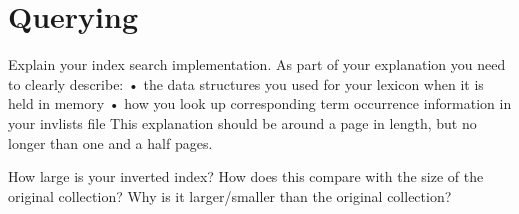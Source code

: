
\section{Querying}
\label{sec:querying}

Explain your index search implementation. As part of your explanation you need to clearly describe:
• the data structures you used for your lexicon when it is held in memory
• how you look up corresponding term occurrence information in your invlists file
This explanation should be around a page in length, but no longer than one and a half pages.



How large is your inverted index? How does this compare with the size of the original collection? Why is it larger/smaller than the original collection?